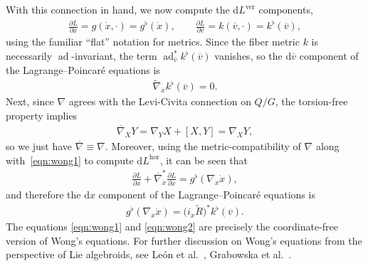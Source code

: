 \documentclass[pdftex]{sigma}
\numberwithin{equation}{section}
\begin{document}
\begin{Example}
With this connection in hand, we now compute the $ \mathrm{d} L ^{ \text{ver} } $ components,
 \begin{gather*}
 \frac{ \partial L }{ \partial \dot{x} } = g ( \dot{x}, \cdot ) = g ^\flat ( \dot{x} ) , \qquad \frac{ \partial L }{ \partial \overline{ v } } = k ( \overline{ v } , \cdot ) = k ^\flat ( \overline{ v } ) ,
 \end{gather*}
using the familiar ``f\/lat'' notation for metrics. Since the f\/iber metric $k$ is necessarily $ \operatorname{ad} $-invariant, the term $ \operatorname{ad} ^\ast _{ \overline{ v } } k ^\flat ( \overline{ v } ) $ vanishes, so the $ \mathrm{d} \overline{ v } $ component of the Lagrange--Poincar\'e equations is
 \begin{gather} \label{eqn:wong1}
 \widetilde{ \nabla } _{ \dot{x} } k ^\flat ( \overline{ v } ) = 0 .
 \end{gather}
 Next, since $ \nabla $ agrees with the Levi-Civita connection on $ Q / G $, the torsion-free property implies
 \begin{gather*}
 \overline{ \nabla } _X Y = \nabla _Y X + [X, Y ] = \nabla _X Y ,
 \end{gather*}
so we just have $ \overline{ \nabla } \equiv \nabla $. Moreover, using the metric-compatibility of $ \nabla $ along with~\eqref{eqn:wong1} to compute $ \mathrm{d} L ^{ \text{hor} } $, it can be seen that
 \begin{gather*}
 \frac{ \partial L }{ \partial x } + \overline{ \nabla } _{ \dot{x} } ^\ast \frac{ \partial L }{ \partial \dot{x} } = g ^\flat ( \nabla _{ \dot{x} } \dot{x} ) ,
 \end{gather*}
 and therefore the $ \mathrm{d} x $ component of the Lagrange--Poincar\'e equations is
 \begin{gather} \label{eqn:wong2}
 g ^\flat ( \nabla _{ \dot{x} } \dot{x} ) = \big( i _{ \dot{x} } \widetilde{ R } \big) ^\ast k ^\flat ( \overline{ v } ) .
 \end{gather}
The equations \eqref{eqn:wong1} and \eqref{eqn:wong2} are precisely the coordinate-free version of Wong's equations. For further discussion on Wong's equations from the perspective of Lie algebroids, see Le\'on et al.~\cite{LeMaMa2005}, Grabowska et al.~\cite{GrUrGr2006}.


\end{Example}
\end{document}

